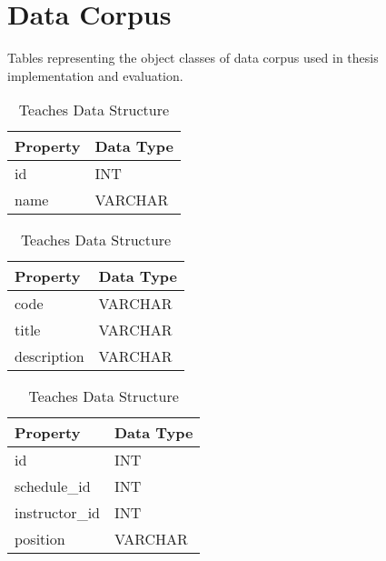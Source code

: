 \chapter{Data Corpus}
\label{chap:data-corpus-def}
	Tables representing the object classes of data corpus used in thesis implementation and evaluation.
	
	\begin{table}[H]
		\begin{subtable}[b]{.5\linewidth}
			\centering
			\begin{tabular}{ll}
				\toprule
				Property & Data Type \\
				\midrule
				id & INT \\
				name & VARCHAR \\
				\bottomrule
			\end{tabular}
			
			\caption{Instructor Data Structure}
			\label{tbl:corpus-instructor}
		\end{subtable}
		\begin{subtable}[b]{.5\linewidth}
			\centering
			\begin{tabular}{ll}
				\toprule
				Property & Data Type \\
				\midrule
				code & VARCHAR \\
				title & VARCHAR \\
				description & VARCHAR \\
				\bottomrule
			\end{tabular}
			
			\caption{Course Data Structure}
			\label{tbl:corpus-course}
		\end{subtable}
		\begin{subtable}[b]{.5\linewidth}
			\centering
			\begin{tabular}{ll}
				\toprule
				Property & Data Type \\
				\midrule
				id & INT \\
				schedule\_id & INT \\
				instructor\_id & INT \\
				position & VARCHAR \\
				\bottomrule
			\end{tabular}
			
			\caption{Teaches Data Structure}
			\label{tbl:corpus-teaches}
		\end{subtable}
	\end{table}
	
